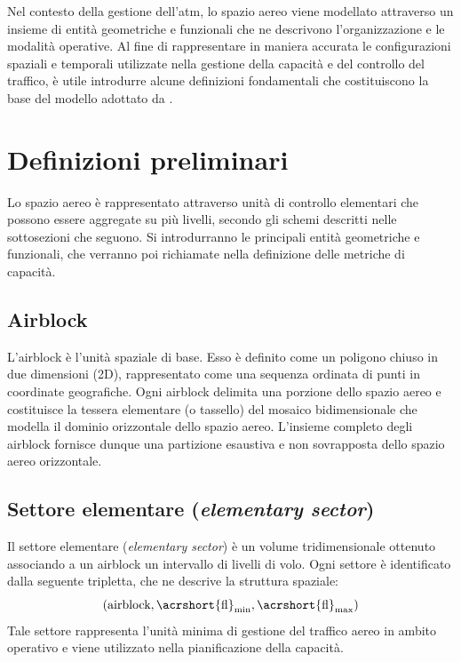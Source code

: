 Nel contesto della gestione dell'\gls{atm}, lo spazio aereo viene modellato attraverso un insieme di entità geometriche e funzionali che ne descrivono l’organizzazione e le modalità operative. Al fine di rappresentare in maniera accurata le configurazioni spaziali e temporali utilizzate nella gestione della capacità e del controllo del traffico, è utile introdurre alcune definizioni fondamentali che costituiscono la base del modello adottato da \citet{eurocontrol2025}.

\section{Definizioni preliminari}
Lo spazio aereo è rappresentato attraverso unità di controllo elementari che possono essere aggregate su più livelli, secondo gli schemi descritti nelle sottosezioni che seguono. Si introdurranno le principali entità geometriche e funzionali, che verranno poi richiamate nella definizione delle metriche di capacità.

\subsection{Airblock}
L’airblock è l’unità spaziale di base. Esso è definito come un poligono chiuso in due dimensioni (2D), rappresentato come una sequenza ordinata di punti in coordinate geografiche. Ogni airblock delimita una porzione dello spazio aereo e costituisce la tessera elementare (o tassello) del mosaico bidimensionale che modella il dominio orizzontale dello spazio aereo. L’insieme completo degli airblock fornisce dunque una partizione esaustiva e non sovrapposta dello spazio aereo orizzontale.
\clearpage
\subsection{Settore elementare (\emph{elementary sector})}
\label{subsec:settore-elementare}
Il settore elementare (\emph{elementary sector}) è un volume tridimensionale ottenuto associando a un airblock un intervallo di livelli di volo. Ogni settore è identificato dalla seguente tripletta, che ne descrive la struttura spaziale:
\begin{equation*}
    (\text{airblock}, \text{\acrshort{fl}}_{\min}, \text{\acrshort{fl}}_{\max})
\end{equation*}
Tale settore rappresenta l’unità minima di gestione del traffico aereo in ambito operativo e viene utilizzato nella pianificazione della capacità.

